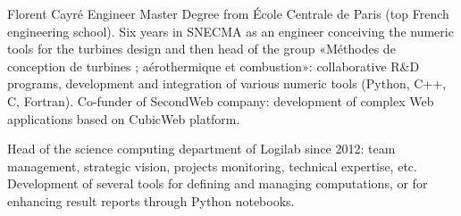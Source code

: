 \begin{participant}{Florent Cayré}
Engineer Master Degree from École Centrale de Paris (top French
engineering school). Six years in SNECMA as an engineer conceiving the
numeric tools for the turbines design and then head of the group
«Méthodes de conception de turbines ; aérothermique et combustion»:
collaborative R&D programs, development and integration of various
numeric tools (Python, C++, C, Fortran). Co-funder of SecondWeb
company: development of complex Web applications based on CubicWeb
platform.

Head of the science computing department of Logilab since 2012: team
management, strategic vision, projects monitoring, technical
expertise, etc. Development of several tools for defining and managing
computations, or for enhancing result reports through Python
notebooks.
\end{participant}
